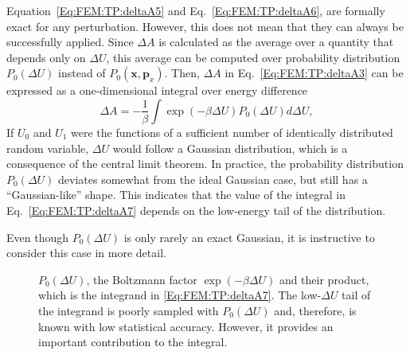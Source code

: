 Equation~\ref{Eq:FEM:TP:deltaA5} and Eq.~\ref{Eq:FEM:TP:deltaA6}, are formally exact for any perturbation. However, this does not mean that they can always be successfully applied. Since $\Delta A$ is calculated as the average over a quantity that depends only on $\Delta U$, this average can be computed over probability distribution $P_0(\Delta U)$ instead of $P_{0}(\mathbf{x},\mathbf{p}_{x})$. Then, $\Delta A$ in Eq.~\ref{Eq:FEM:TP:deltaA3} can be expressed as a one-dimensional integral over energy difference
\begin{equation}
\Delta A = -\frac{1}{\beta} \int \exp(-\beta \Delta U) P_{0}(\Delta U) d\Delta U,
\label{Eq:FEM:TP:deltaA7}
\end{equation}
If $U_{0}$ and $U_{1}$ were the functions of a sufficient number of identically distributed random variable, $\Delta U$ would follow a Gaussian distribution, which is a consequence of the central limit theorem. In practice, the probability distribution $P_{0}(\Delta U)$ deviates somewhat from the ideal Gaussian case, but still has a ``Gaussian-like'' shape. This indicates that the value of the integral in Eq.~\ref{Eq:FEM:TP:deltaA7} depends on the low-energy tail of the distribution.

Even though $P_{0}(\Delta U)$ is only rarely an exact Gaussian, it is instructive to consider this case in more detail. 
\begin{figure}
	\centering
	\caption{$P_{0}(\Delta U)$, the Boltzmann factor $\exp(-\beta \Delta U)$ and their product, which is the integrand in \ref{Eq:FEM:TP:deltaA7}. The low-$\Delta U$ tail of the integrand is poorly sampled with $P_{0}(\Delta U)$ and, therefore, is known with low statistical accuracy. However, it provides an important contribution to the integral.}\label{Fig:TP:Pdistribution}
\end{figure}

